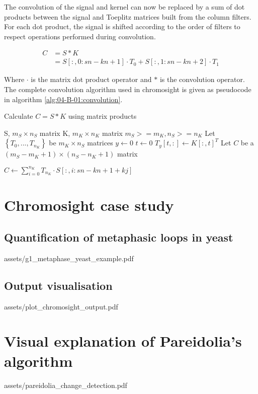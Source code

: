 The convolution of the signal and kernel can now be replaced by a sum of dot products between the signal and Toeplitz matrices built from the column filters. For each dot product, the signal is shifted according to the order of filters to respect operations performed during convolution.

\begin{align}
    C &= S * K \\
      &= S[:, 0: sn-kn+1] \cdot T_0 + S[:, 1:sn-kn+2] \cdot T_1
\end{align}

Where $\cdot$ is the matrix dot product operator and $*$ is the convolution operator.
The complete convolution algorithm used in chromosight is given as pseudocode in algorithm \ref{alg:04-B-01:convolution}.

\begin{algorithm}
\caption{Calculate $C = S * K$ using matrix products}
\label{alg:04-B-01:convolution}
\begin{algorithmic}
\REQUIRE S, $m_S \times n_S$ matrix
\REQUIRE K, $m_K \times n_K$ matrix
\ENSURE $m_S >= m_K, n_S >= n_K$
\STATE Let $\left\{T_0, ..., T_{n_K}\right\}$ be $m_K \times n_S$ matrices
\STATE $y \leftarrow 0$
    \STATE $t \leftarrow 0$
        \STATE $T_y[t, :] \leftarrow K[:, t]^T$
    \ENDWHILE
\ENDWHILE
\STATE Let $C$ be a $(m_S - m_K + 1) \times (n_S - n_K + 1)$ matrix

\STATE $C \leftarrow \sum_{i=0}^{n_K}{T_{n_K} \cdot S[: , i: sn-kn+1+kj]}$ 
\end{algorithmic}
\end{algorithm}


\chapter{Chromosight case study}
\label{ch:04-B:demo}

\section{Quantification of metaphasic loops in yeast}
 {assets/g1_metaphase_yeast_example.pdf}    

\section{Output visualisation}
 {assets/plot_chromosight_output.pdf}

\chapter{Visual explanation of Pareidolia's algorithm}
\label{ch:04-C:pareidolia}

 {assets/pareidolia_change_detection.pdf}